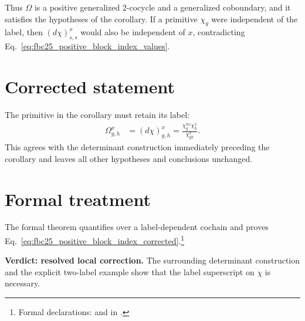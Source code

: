 \documentclass{article}
\begin{document}
Thus $\Omega$ is a positive generalized $2$-cocycle and a generalized
coboundary, and it satisfies the hypotheses of the corollary. If a primitive
$\chi_g$ were independent of the label, then $(d\chi)^x_{s,s}$ would also be
independent of $x$, contradicting
Eq.~\ref{eq:fbc25_positive_block_index_values}.

\section{Corrected statement}

The primitive in the corollary must retain its label:
\begin{align}
    \Omega^x_{g,h}
        &=(d\chi)^x_{g,h}
          =\frac{\chi^{h x}_g\chi^x_h}{\chi^x_{gh}}.
    \label{eq:fbc25_positive_block_index_corrected}
\end{align}
This agrees with the determinant construction immediately preceding the
corollary and leaves all other hypotheses and conclusions unchanged.

\section{Formal treatment}

The formal theorem quantifies over a label-dependent cochain and proves
Eq.~\ref{eq:fbc25_positive_block_index_corrected}.\footnote{Formal
declarations:  and
 in
.}

\textbf{Verdict: resolved local correction.}
The surrounding determinant construction and the explicit two-label example
show that the label superscript on $\chi$ is necessary.



\end{document}
